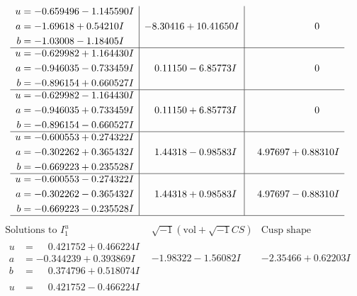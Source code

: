 \documentclass[1p]{elsarticle_modified}
\theoremstyle{definition}
\newcommand{\I}{\sqrt{-1}}
\begin{document}
$$\begin{array}{c|c|c}
\begin{aligned}
u &= -0.659496 - 1.145590 I \\
a &= -1.69618 + 0.54210 I \\
b &= -1.03008 - 1.18405 I\end{aligned}
 & -8.30416 + 10.41650 I & \phantom{-0.000000 } 0 \\ \hline\begin{aligned}
u &= -0.629982 + 1.164430 I \\
a &= -0.946035 - 0.733459 I \\
b &= -0.896154 + 0.660527 I\end{aligned}
 & \phantom{-}0.11150 - 6.85773 I & \phantom{-0.000000 } 0 \\ \hline\begin{aligned}
u &= -0.629982 - 1.164430 I \\
a &= -0.946035 + 0.733459 I \\
b &= -0.896154 - 0.660527 I\end{aligned}
 & \phantom{-}0.11150 + 6.85773 I & \phantom{-0.000000 } 0 \\ \hline\begin{aligned}
u &= -0.600553 + 0.274322 I \\
a &= -0.302262 + 0.365432 I \\
b &= -0.669223 + 0.235528 I\end{aligned}
 & \phantom{-}1.44318 - 0.98583 I & \phantom{-}4.97697 + 0.88310 I \\ \hline\begin{aligned}
u &= -0.600553 - 0.274322 I \\
a &= -0.302262 - 0.365432 I \\
b &= -0.669223 - 0.235528 I\end{aligned}
 & \phantom{-}1.44318 + 0.98583 I & \phantom{-}4.97697 - 0.88310 I\\
 \hline 
 \end{array}$$\newpage$$\begin{array}{c|c|c}  
\text{Solutions to }I^u_{1}& \I (\text{vol} + \sqrt{-1}CS) & \text{Cusp shape}\\
 \hline 
\begin{aligned}
u &= \phantom{-}0.421752 + 0.466224 I \\
a &= -0.344239 + 0.393869 I \\
b &= \phantom{-}0.374796 + 0.518074 I\end{aligned}
 & -1.98322 - 1.56082 I & -2.35466 + 0.62203 I \\ \hline\begin{aligned}
u &= \phantom{-}0.421752 - 0.466224 I \\

\end{aligned}
\end{array}$$
\end{document}
